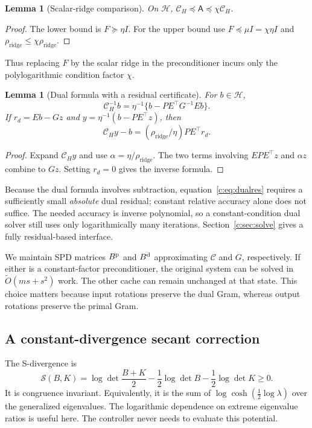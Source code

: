 \documentclass[11pt]{amsart}
\newtheorem{lemma}[theorem]{Lemma}
\theoremstyle{definition}\newtheorem{definition}[theorem]{Definition}
\theoremstyle{remark}\newtheorem{remark}[theorem]{Remark}
\numberwithin{equation}{section}
\begin{document}
\begin{lemma}[Scalar-ridge comparison]\label{c:lem:scalar}
On $\mathcal H$, $\mathcal C_H\preceq \mathsf A\preceq\chi \mathcal C_H$.
\end{lemma}
\begin{proof}
The lower bound is $F\succeq\eta I$. For the upper bound use
$F\preceq\mu I=\chi\eta I$ and $\rho_{\mathrm{ridge}}\le\chi\rho_{\mathrm{ridge}}$.
\end{proof}
Thus replacing $F$ by the scalar ridge in the preconditioner incurs only
the polylogarithmic condition factor $\chi$.

\begin{lemma}[Dual formula with a residual certificate]\label{c:lem:dual}
For $b\in\mathcal H$,
\[
 \mathcal C_H^{-1}b=\eta^{-1}\{b-PE^\top G^{-1}Eb\}.
\]
If $r_d=Eb-Gz$ and $y=\eta^{-1}(b-PE^\top z)$, then
\begin{equation}\label{c:eq:dualres}
 \mathcal C_Hy-b=(\rho_{\mathrm{ridge}}/\eta)PE^\top r_d.
\end{equation}
\end{lemma}
\begin{proof}
Expand $\mathcal C_Hy$ and use $\alpha=\eta/\rho_{\mathrm{ridge}}$. The two terms involving
$EPE^\top z$ and $\alpha z$ combine to $Gz$. Setting $r_d=0$ gives the
inverse formula.
\end{proof}
Because the dual formula involves subtraction,
equation~\eqref{c:eq:dualres} requires a sufficiently small
\emph{absolute} dual residual; constant relative accuracy alone does not suffice. The needed accuracy is inverse polynomial,
so a constant-condition dual solver still uses only logarithmically many
iterations. Section~\ref{c:sec:solve} gives a fully residual-based interface.

We maintain SPD matrices $B^{\rm p}$ and $B^{\rm d}$ approximating $\mathcal C$ and
$G$, respectively. If either is a constant-factor preconditioner, the
original system can be solved in $\widetilde O(ms+s^2)$ work. The other cache can remain unchanged at that state. This choice matters
because input
rotations preserve the dual Gram, whereas output rotations preserve the
primal Gram.

\subsection{A constant-divergence secant correction}
The S-divergence \cite{Sra} is
\begin{equation}\label{c:eq:S}
 \mathcal{S}(B,K)=\log\det\frac{B+K}{2}
       -\frac12\log\det B-\frac12\log\det K\ge0.
\end{equation}
It is congruence invariant. Equivalently, it is the sum of
$\log\cosh(\tfrac12\log\lambda)$ over the generalized eigenvalues.
The logarithmic dependence on extreme eigenvalue ratios is useful here.
The controller never needs to evaluate this potential.
\end{document}
